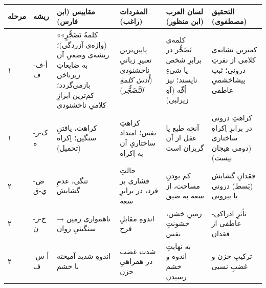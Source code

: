 \begin{RTL}
\begin{otherlanguage}{persian}
\begin{longtable}[]{@{}
  >{\centering\arraybackslash}p{}
  >{\centering\arraybackslash}p{}
  >{\raggedright\arraybackslash}p{}
  >{\raggedright\arraybackslash}p{}
  >{\raggedright\arraybackslash}p{}
  >{\raggedright\arraybackslash}p{}@{}}
\toprule\noalign{}
\begin{minipage}[b]{\linewidth}\centering
مرحله
\end{minipage} & \begin{minipage}[b]{\linewidth}\centering
ریشه
\end{minipage} & \begin{minipage}[b]{\linewidth}\raggedright
مقاییس (ابن فارس)
\end{minipage} & \begin{minipage}[b]{\linewidth}\raggedright
المفردات (راغب)
\end{minipage} & \begin{minipage}[b]{\linewidth}\raggedright
لسان العرب (ابن منظور)
\end{minipage} & \begin{minipage}[b]{\linewidth}\raggedright
التحقیق (مصطفوی)
\end{minipage} \\
\midrule\noalign{}
\endhead
\bottomrule\noalign{}
\endlastfoot
۱ & أ-ف-ف & «کلمةُ تَضَجُّرٍ» (واژه‌ی آزردگی)؛ ریشه‌ی وضعیِ آن به ضایعاتِ زیرناخن
بازمی‌گردد؛ کم‌ترین ابرازِ کلامیِ ناخشنودی & پایین‌ترین تعبیرِ زبانیِ ناخشنودی
(\emph{أَدنیٰ کلمةِ التَّضَجُّر}) & کلمه‌ی تَضَجُّر در برابرِ شخص یا شیءِ ناپسند؛ نیز
اُفّه (آهِ زیرلبی) & کمترین نشانه‌ی کلامی از نفرتِ درونی؛ ثبتِ پیشاخشمیِ
عاطفی \\
۱ & ک-ر-ه & کراهت، یافتنِ سنگین؛ اِکراه (تحمیل) & کراهتِ نفس؛ امتداد
ساختاریِ آن به اِکراه & آنچه طبع یا عقل از آن گریزان است & کراهتِ درونی در
برابرِ اِکراهِ ساختاری (دومی هیجان نیست) \\
۲ & ض-ي-ق & تنگی، عدمِ گشایش & حالتِ فشاری بر فرد، در برابرِ سعه & کم بودنِ
مساحت، از سعه به ضیق & فقدانِ گشایش (بَسط) درونی یا بیرونی \\
۲ & ح-ز-ن & ناهمواری زمین → سنگینیِ روان & اندوهِ مقابلِ فرح & زمینِ خشن،
خشونتِ نفس & تأثرِ ادراکی-عاطفی از فقدان \\
۲ & أ-س-ف & اندوهِ شدید آمیخته با خشم & شدت غضب در همراهیِ حزن & به نهایتِ
اندوه و خشم رسیدن & ترکیبِ حزن و غضبِ نسبی \\

\end{longtable}
\end{otherlanguage}
\end{RTL}
